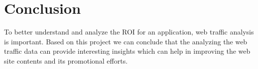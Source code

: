 \section{Conclusion}

To better understand and analyze the ROI for an application, web traffic analysis is important. Based on this project we can conclude that the analyzing the web traffic data can provide interesting insights which can help in improving the web site contents and its promotional efforts. 
